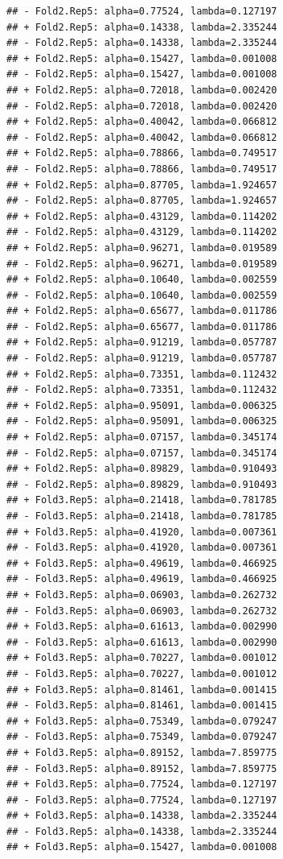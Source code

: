 \documentclass[
]{article}
\begin{document}
\begin{verbatim}
## - Fold2.Rep5: alpha=0.77524, lambda=0.127197 
## + Fold2.Rep5: alpha=0.14338, lambda=2.335244 
## - Fold2.Rep5: alpha=0.14338, lambda=2.335244 
## + Fold2.Rep5: alpha=0.15427, lambda=0.001008 
## - Fold2.Rep5: alpha=0.15427, lambda=0.001008 
## + Fold2.Rep5: alpha=0.72018, lambda=0.002420 
## - Fold2.Rep5: alpha=0.72018, lambda=0.002420 
## + Fold2.Rep5: alpha=0.40042, lambda=0.066812 
## - Fold2.Rep5: alpha=0.40042, lambda=0.066812 
## + Fold2.Rep5: alpha=0.78866, lambda=0.749517 
## - Fold2.Rep5: alpha=0.78866, lambda=0.749517 
## + Fold2.Rep5: alpha=0.87705, lambda=1.924657 
## - Fold2.Rep5: alpha=0.87705, lambda=1.924657 
## + Fold2.Rep5: alpha=0.43129, lambda=0.114202 
## - Fold2.Rep5: alpha=0.43129, lambda=0.114202 
## + Fold2.Rep5: alpha=0.96271, lambda=0.019589 
## - Fold2.Rep5: alpha=0.96271, lambda=0.019589 
## + Fold2.Rep5: alpha=0.10640, lambda=0.002559 
## - Fold2.Rep5: alpha=0.10640, lambda=0.002559 
## + Fold2.Rep5: alpha=0.65677, lambda=0.011786 
## - Fold2.Rep5: alpha=0.65677, lambda=0.011786 
## + Fold2.Rep5: alpha=0.91219, lambda=0.057787 
## - Fold2.Rep5: alpha=0.91219, lambda=0.057787 
## + Fold2.Rep5: alpha=0.73351, lambda=0.112432 
## - Fold2.Rep5: alpha=0.73351, lambda=0.112432 
## + Fold2.Rep5: alpha=0.95091, lambda=0.006325 
## - Fold2.Rep5: alpha=0.95091, lambda=0.006325 
## + Fold2.Rep5: alpha=0.07157, lambda=0.345174 
## - Fold2.Rep5: alpha=0.07157, lambda=0.345174 
## + Fold2.Rep5: alpha=0.89829, lambda=0.910493 
## - Fold2.Rep5: alpha=0.89829, lambda=0.910493 
## + Fold3.Rep5: alpha=0.21418, lambda=0.781785 
## - Fold3.Rep5: alpha=0.21418, lambda=0.781785 
## + Fold3.Rep5: alpha=0.41920, lambda=0.007361 
## - Fold3.Rep5: alpha=0.41920, lambda=0.007361 
## + Fold3.Rep5: alpha=0.49619, lambda=0.466925 
## - Fold3.Rep5: alpha=0.49619, lambda=0.466925 
## + Fold3.Rep5: alpha=0.06903, lambda=0.262732 
## - Fold3.Rep5: alpha=0.06903, lambda=0.262732 
## + Fold3.Rep5: alpha=0.61613, lambda=0.002990 
## - Fold3.Rep5: alpha=0.61613, lambda=0.002990 
## + Fold3.Rep5: alpha=0.70227, lambda=0.001012 
## - Fold3.Rep5: alpha=0.70227, lambda=0.001012 
## + Fold3.Rep5: alpha=0.81461, lambda=0.001415 
## - Fold3.Rep5: alpha=0.81461, lambda=0.001415 
## + Fold3.Rep5: alpha=0.75349, lambda=0.079247 
## - Fold3.Rep5: alpha=0.75349, lambda=0.079247 
## + Fold3.Rep5: alpha=0.89152, lambda=7.859775 
## - Fold3.Rep5: alpha=0.89152, lambda=7.859775 
## + Fold3.Rep5: alpha=0.77524, lambda=0.127197 
## - Fold3.Rep5: alpha=0.77524, lambda=0.127197 
## + Fold3.Rep5: alpha=0.14338, lambda=2.335244 
## - Fold3.Rep5: alpha=0.14338, lambda=2.335244 
## + Fold3.Rep5: alpha=0.15427, lambda=0.001008 

\end{verbatim}
\end{document}
